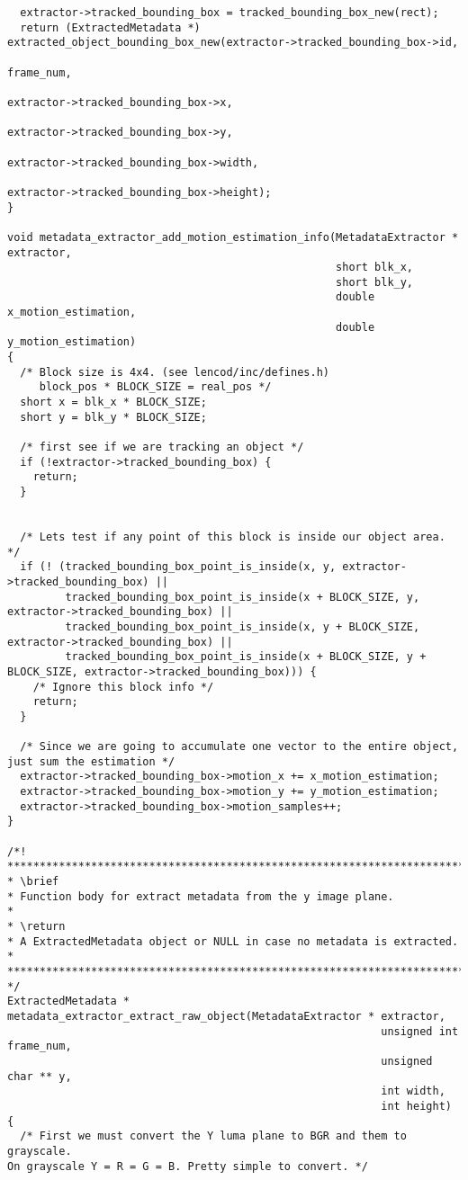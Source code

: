 \begin{lstlisting}
  extractor->tracked_bounding_box = tracked_bounding_box_new(rect); 
  return (ExtractedMetadata *) extracted_object_bounding_box_new(extractor->tracked_bounding_box->id, 
                                                                 frame_num, 
                                                                 extractor->tracked_bounding_box->x, 
                                                                 extractor->tracked_bounding_box->y, 
                                                                 extractor->tracked_bounding_box->width, 
                                                                 extractor->tracked_bounding_box->height);
}

void metadata_extractor_add_motion_estimation_info(MetadataExtractor * extractor, 
                                                   short blk_x, 
                                                   short blk_y,
                                                   double x_motion_estimation,
                                                   double y_motion_estimation)
{
  /* Block size is 4x4. (see lencod/inc/defines.h)
     block_pos * BLOCK_SIZE = real_pos */
  short x = blk_x * BLOCK_SIZE;
  short y = blk_y * BLOCK_SIZE;

  /* first see if we are tracking an object */
  if (!extractor->tracked_bounding_box) {
    return;
  }

  
  /* Lets test if any point of this block is inside our object area.  */
  if (! (tracked_bounding_box_point_is_inside(x, y, extractor->tracked_bounding_box) ||
         tracked_bounding_box_point_is_inside(x + BLOCK_SIZE, y, extractor->tracked_bounding_box) ||
         tracked_bounding_box_point_is_inside(x, y + BLOCK_SIZE, extractor->tracked_bounding_box) ||
         tracked_bounding_box_point_is_inside(x + BLOCK_SIZE, y + BLOCK_SIZE, extractor->tracked_bounding_box))) {
    /* Ignore this block info */ 
    return;
  }

  /* Since we are going to accumulate one vector to the entire object, just sum the estimation */
  extractor->tracked_bounding_box->motion_x += x_motion_estimation;
  extractor->tracked_bounding_box->motion_y += y_motion_estimation;
  extractor->tracked_bounding_box->motion_samples++;
}

/*!
*************************************************************************************
* \brief
* Function body for extract metadata from the y image plane.
*
* \return
* A ExtractedMetadata object or NULL in case no metadata is extracted.
*
*************************************************************************************
*/
ExtractedMetadata * metadata_extractor_extract_raw_object(MetadataExtractor * extractor,
                                                          unsigned int frame_num,
                                                          unsigned char ** y,
                                                          int width,
                                                          int height)
{
  /* First we must convert the Y luma plane to BGR and them to grayscale.
On grayscale Y = R = G = B. Pretty simple to convert. */


\end{lstlisting}
